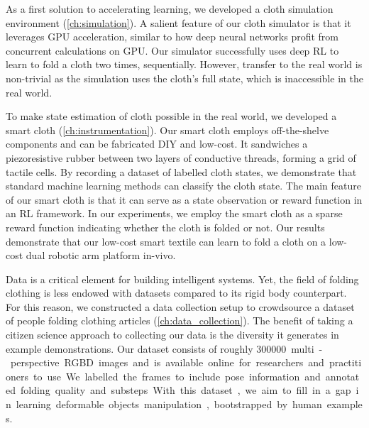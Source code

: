 \documentclass[\home/main.tex]{subfiles}
\begin{document}
As a first solution to accelerating learning, we developed a cloth simulation environment (\cref{ch:simulation}). A salient feature of our cloth simulator is that it leverages \gls{GPU} acceleration, similar to how deep neural networks profit from concurrent calculations on \gls{GPU}. Our simulator successfully uses deep \gls{RL} to learn to fold a cloth two times, sequentially. However, transfer to the real world is non-trivial as the simulation uses the cloth's full state, which is inaccessible in the real world.

To make state estimation of cloth possible in the real world, we developed a smart cloth (\cref{ch:instrumentation}). Our smart cloth employs off-the-shelve components and can be fabricated DIY and low-cost. It sandwiches a piezoresistive rubber between two layers of conductive threads, forming a grid of tactile cells. By recording a dataset of labelled cloth states, we demonstrate that standard machine learning methods can classify the cloth state. The main feature of our smart cloth is that it can serve as a state observation or reward function in an RL framework. In our experiments, we employ the smart cloth as a sparse reward function indicating whether the cloth is folded or not. Our results demonstrate that our low-cost smart textile can learn to fold a cloth on a low-cost dual robotic arm platform in-vivo.

Data is a critical element for building intelligent systems. Yet, the field of folding clothing is less endowed with datasets compared to its rigid body counterpart. For this reason, we constructed a data collection setup to crowdsource a dataset of people folding clothing articles (\cref{ch:data_collection}). The benefit of taking a citizen science approach to collecting our data is the diversity it generates in example demonstrations. Our dataset consists of roughly \qty{300000} multi-perspective RGBD images and is available online for researchers and practitioners to use. We labelled the frames to include pose information and annotated folding quality and substeps. With this dataset, we aim to fill in a gap in learning deformable objects manipulation, bootstrapped by human examples.
\end{document}
